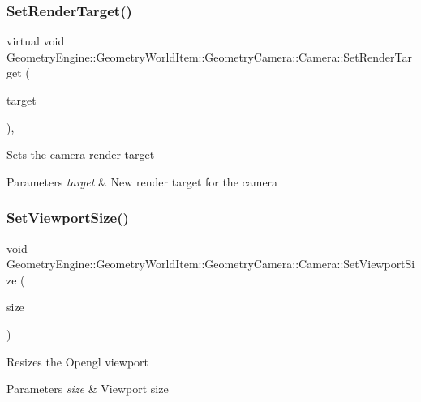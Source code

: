 \subsubsection{\texorpdfstring{SetRenderTarget()}{SetRenderTarget()}}
{\footnotesize\ttfamily virtual void Geometry\+Engine\+::\+Geometry\+World\+Item\+::\+Geometry\+Camera\+::\+Camera\+::\+Set\+Render\+Target (\begin{DoxyParamCaption}\item[{const \mbox{\hyperlink{namespace_geometry_engine_1_1_geometry_world_item_1_1_geometry_camera_a3766848bae97ff8203fa26907ac359ef}{Camera\+Targets}} \&}]{target }\end{DoxyParamCaption})\hspace{0.3cm}{\ttfamily [inline]}, {\ttfamily [virtual]}}

Sets the camera render target 
\begin{DoxyParams}{Parameters}
{\em target} & New render target for the camera \\
\hline
\end{DoxyParams}
\mbox{\label{class_geometry_engine_1_1_geometry_world_item_1_1_geometry_camera_1_1_camera_a96954629a05eba955adc1dff2df1fbdb}} 
\subsubsection{\texorpdfstring{SetViewportSize()}{SetViewportSize()}}
{\footnotesize\ttfamily void Geometry\+Engine\+::\+Geometry\+World\+Item\+::\+Geometry\+Camera\+::\+Camera\+::\+Set\+Viewport\+Size (\begin{DoxyParamCaption}\item[{const Q\+Vector4D \&}]{size }\end{DoxyParamCaption})\hspace{0.3cm}{\ttfamily [virtual]}}

Resizes the Opengl viewport 
\begin{DoxyParams}{Parameters}
{\em size} & Viewport size \\
\hline
\end{DoxyParams}


